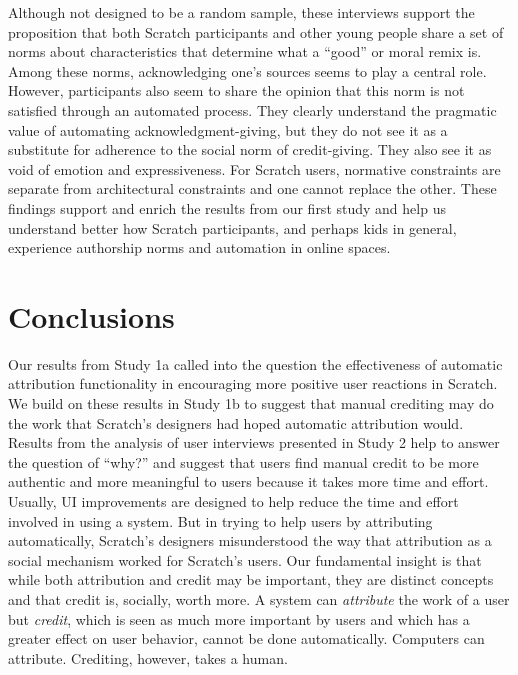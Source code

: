 Although not designed to be a random sample, these interviews support
the proposition that both Scratch participants and other young people
share a set of norms about characteristics that determine what a
``good'' or moral remix is. Among these norms, acknowledging one's
sources seems to play a central role. However, participants also seem
to share the opinion that this norm is not satisfied through an
automated process.  They clearly understand the pragmatic value of
automating acknowledgment-giving, but
they do not see it as a substitute for adherence to the social norm of
credit-giving. They also see it as void of emotion and expressiveness.
For Scratch users, normative constraints are separate from
architectural constraints and one cannot replace the other.
These findings support and enrich the results from our first
study and help us understand better how Scratch participants, and
perhaps kids in general, experience authorship norms and automation in
online spaces.

\section{Conclusions}

Our results from Study 1a called into the question the effectiveness
of automatic attribution functionality in encouraging more positive
user reactions in Scratch. We build on these results in Study 1b to
suggest that manual crediting may do the work that Scratch's designers
had hoped automatic attribution would. Results from the analysis of
user interviews presented in Study 2 help to answer the question of
``why?'' and suggest that users find manual credit to be more
authentic and more meaningful to users because it takes more time and
effort. Usually, UI  improvements are designed to help reduce the time
and effort involved in using a system. But in trying to help users by attributing automatically,
Scratch's designers misunderstood the way that attribution as a social
mechanism worked for Scratch's users. Our fundamental insight is that
while both attribution and credit may be important, they are distinct
concepts and that credit is, socially, worth more. A system can
\emph{attribute} the work of a user but \emph{credit}, which is seen
as much more important by users and which has a greater effect on user
behavior, cannot be done automatically. Computers can
attribute. Crediting, however, takes a human.

